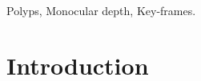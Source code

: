 \documentclass[journal]{IEEEtran}
\begin{document}
\begin{IEEEkeywords}
Polyps,
Monocular depth,  Key-frames.
\end{IEEEkeywords}






%
\IEEEpeerreviewmaketitle



\section{Introduction}
\end{document}
